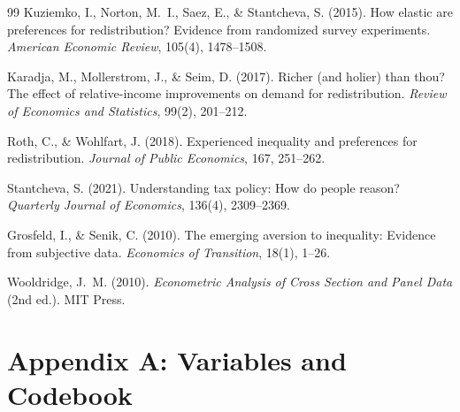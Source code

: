 \documentclass[11pt,a4paper]{article}
\begin{document}
\begin{thebibliography}{99}
Kuziemko, I., Norton, M.~I., Saez, E., \& Stantcheva, S. (2015).
\newblock How elastic are preferences for redistribution? Evidence from randomized survey experiments.
\newblock \emph{American Economic Review}, 105(4), 1478--1508.

Karadja, M., Mollerstrom, J., \& Seim, D. (2017).
\newblock Richer (and holier) than thou? The effect of relative-income improvements on demand for redistribution.
\newblock \emph{Review of Economics and Statistics}, 99(2), 201--212.

Roth, C., \& Wohlfart, J. (2018).
\newblock Experienced inequality and preferences for redistribution.
\newblock \emph{Journal of Public Economics}, 167, 251--262.

Stantcheva, S. (2021).
\newblock Understanding tax policy: How do people reason?
\newblock \emph{Quarterly Journal of Economics}, 136(4), 2309--2369.

Grosfeld, I., \& Senik, C. (2010).
\newblock The emerging aversion to inequality: Evidence from subjective data.
\newblock \emph{Economics of Transition}, 18(1), 1--26.

Wooldridge, J.~M. (2010).
\newblock \emph{Econometric Analysis of Cross Section and Panel Data} (2nd ed.).
\newblock MIT Press.

\end{thebibliography}

\clearpage
\appendix
\section*{Appendix A: Variables and Codebook}
\end{document}
